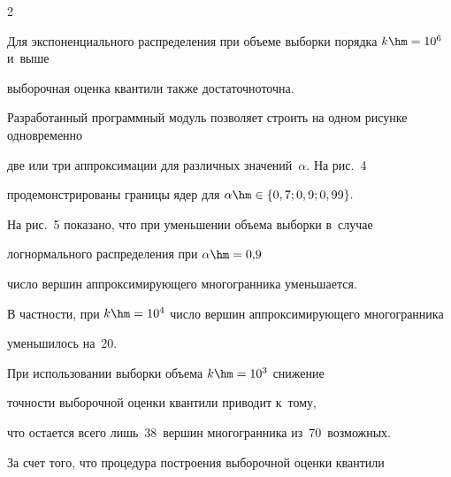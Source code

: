 \begin{multicols}{2}
\begin{figure}
\begin{minipage}[t]{80mm}
\begin{center}
 \end{center}

\vspace*{-9pt}


\end{minipage}

\end{figure}





Для экспоненциального распределения при объеме выборки порядка $k\hm=10^6$ и~выше

 выборочная оценка кван\-ти\-ли также достаточно\linebreak точна.



Разработанный программный модуль позволяет строить на одном рисунке одновременно 

две или три аппроксимации для различных значений~$\alpha.$ На рис.~4 

продемонстрированы границы ядер для $\alpha\hm\in\{0,7; 0,9; 0,99\}.$









На рис.~5 показано, что при уменьшении объема выборки в~случае 

логнормального распределения при $\alpha\hm=0{,}9$

чис\-ло вершин аппроксимирующего многогранника уменьшается.





В частности, при $k\hm=10^4$ чис\-ло вершин аппроксимирующего многогранника 

уменьшилось на~20.





При использовании выборки объема $k\hm=10^3$ снижение 

точ\-ности выборочной оценки квантили приводит к~тому,

что остается всего лишь~38~вершин многогранника из~70~возможных.



За счет того, что процедура построения выборочной оценки квантили 


\end{multicols}
